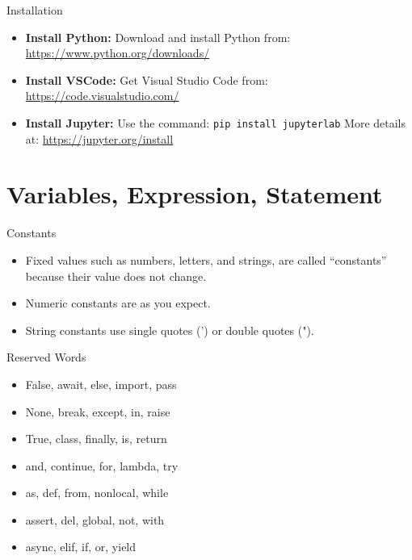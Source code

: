 \documentclass[serif, aspectratio=169]{beamer}
\begin{document}
\begin{frame}{Installation}
    \begin{itemize}[<+-| alert@+>] %
        \item \textbf{Install Python:} \newline
        Download and install Python from: \newline
        \url{https://www.python.org/downloads/}
        \item \textbf{Install VSCode:} \newline
        Get Visual Studio Code from: \newline
        \url{https://code.visualstudio.com/}
        \item \textbf{Install Jupyter:} \newline
        Use the command: \newline
        \texttt{pip install jupyterlab} \newline
        More details at: \newline
        \url{https://jupyter.org/install}
    \end{itemize}
\end{frame}



\section{Variables, Expression, Statement}

\begin{frame}{Constants}
    \begin{itemize}[<+-| alert@+>] %
        \item Fixed values such as numbers, letters, and strings, are called “constants” because their value does not change.
        \item Numeric constants are as you expect.
        \item String constants use single quotes (') or double quotes (").
    \end{itemize}
\end{frame}

\begin{frame}{Reserved Words}
    \begin{itemize}[<+-| alert@+>] %
        \item False, await, else, import, pass
        \item None, break, except, in, raise
        \item True, class, finally, is, return
        \item and, continue, for, lambda, try
        \item as, def, from, nonlocal, while
        \item assert, del, global, not, with
        \item async, elif, if, or, yield
    \end{itemize}
\end{frame}
\end{document}
